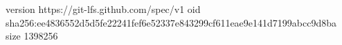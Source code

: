 version https://git-lfs.github.com/spec/v1
oid sha256:ee4836552d5d5fe22241fef6e52337e843299cf611eae9e141d7199abcc9d8ba
size 1398256
